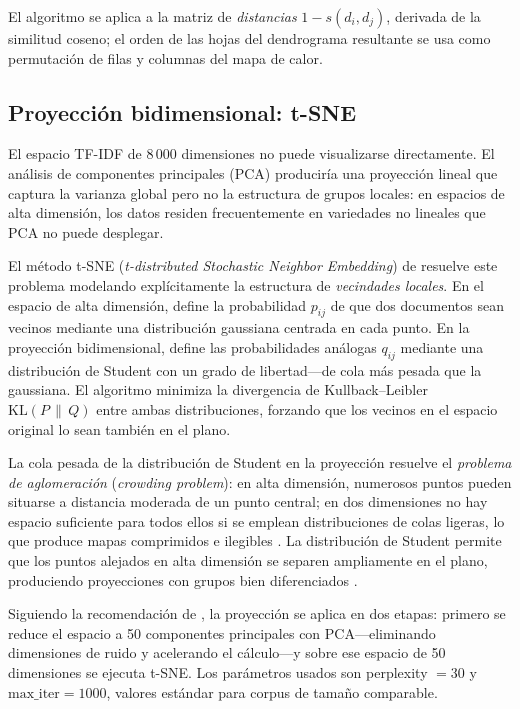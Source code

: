 \documentclass[11pt,a4paper]{article}
\begin{document}
El algoritmo se aplica a la matriz de \textit{distancias} $1 - s(d_i, d_j)$, derivada de la similitud coseno; el orden de las hojas del dendrograma resultante se usa como permutación de filas y columnas del mapa de calor.

\subsection{Proyección bidimensional: t-SNE}

El espacio TF-IDF de 8\,000 dimensiones no puede visualizarse directamente.
El análisis de componentes principales (PCA) produciría una proyección lineal que captura la varianza global pero no la estructura de grupos locales: en espacios de alta dimensión, los datos residen frecuentemente en variedades no lineales que PCA no puede desplegar.

El método t-SNE (\textit{t-distributed Stochastic Neighbor Embedding}) de \citet{Maaten2008} resuelve este problema modelando explícitamente la estructura de \textit{vecindades locales}.
En el espacio de alta dimensión, define la probabilidad $p_{ij}$ de que dos documentos sean vecinos mediante una distribución gaussiana centrada en cada punto.
En la proyección bidimensional, define las probabilidades análogas $q_{ij}$ mediante una distribución de Student con un grado de libertad---de cola más pesada que la gaussiana.
El algoritmo minimiza la divergencia de Kullback--Leibler $\mathrm{KL}(P\,\|\,Q)$ entre ambas distribuciones, forzando que los vecinos en el espacio original lo sean también en el plano.

La cola pesada de la distribución de Student en la proyección resuelve el \textit{problema de aglomeración} (\textit{crowding problem}): en alta dimensión, numerosos puntos pueden situarse a distancia moderada de un punto central; en dos dimensiones no hay espacio suficiente para todos ellos si se emplean distribuciones de colas ligeras, lo que produce mapas comprimidos e ilegibles \citep{Maaten2008}.
La distribución de Student permite que los puntos alejados en alta dimensión se separen ampliamente en el plano, produciendo proyecciones con grupos bien diferenciados \citep{Wattenberg2016}.

Siguiendo la recomendación de \citet{Maaten2008}, la proyección se aplica en dos etapas: primero se reduce el espacio a 50 componentes principales con PCA---eliminando dimensiones de ruido y acelerando el cálculo---y sobre ese espacio de 50 dimensiones se ejecuta t-SNE.
Los parámetros usados son perplexity $= 30$ y $\mathrm{max\_iter} = 1000$, valores estándar para corpus de tamaño comparable.
\end{document}
